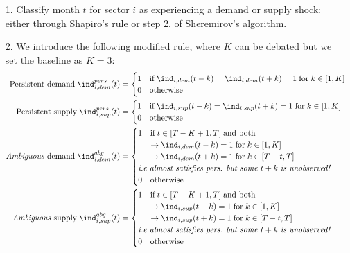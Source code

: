 \begin{itemize}
    \item[1.] Classify month $t$ for sector $i$ as experiencing a demand or supply shock: either through Shapiro's rule or step 2. of Sheremirov's algorithm.
    \item[2.] We introduce the following modified rule, where $K$ can be debated but we set the baseline as $K=3$:
    \begin{align*}
        \textrm{Persistent demand} \; \ind_{i,dem}^{pers}(t) &= \begin{cases} 1 \quad \textrm{if} \; \ind_{i,dem}(t-k)=\ind_{i,dem}(t+k) = 1 \; \textrm{for}\; k \in[1,K] \\ 0 \quad \textrm{otherwise} \end{cases} \\ 
        \textrm{Persistent supply} \; \ind_{i,sup}^{pers}(t) &= \begin{cases} 1 \quad \textrm{if} \; \ind_{i,sup}(t-k)=\ind_{i,sup}(t+k) = 1 \; \textrm{for}\; k \in[1,K] \\ 0 \quad \textrm{otherwise} \end{cases} \\ 
        \textrm{\textit{Ambiguous} demand} \; \ind_{i,dem}^{abg}(t) &= \begin{cases} 1 \quad \textrm{if} \; t\in [T-K+1,T] \; \textrm{and both}\\ \quad \; \; \rightarrow \ind_{i,dem}(t-k)= 1 \; \textrm{for}\; k \in[1,K] \\ \quad \; \; \rightarrow \ind_{i,dem}(t+k)= 1 \; \textrm{for}\; k \in[T-t,T] \\ \textrm{\textit{i.e almost satisfies pers. but some} $t+k$ \textit{is unobserved!}} \\ 0 \quad \textrm{otherwise} \end{cases} \\ 
        \textrm{\textit{Ambiguous} supply} \; \ind_{i,sup}^{abg}(t) &= \begin{cases} 1 \quad \textrm{if} \; t\in [T-K+1,T] \; \textrm{and both}\\ \quad \; \; \rightarrow \ind_{i,sup}(t-k)= 1 \; \textrm{for}\; k \in[1,K] \\ \quad \; \; \rightarrow \ind_{i,sup}(t+k)= 1 \; \textrm{for}\; k \in[T-t,T] \\ \textrm{\textit{i.e almost satisfies pers. but some} $t+k$ \textit{is unobserved!}} \\ 0 \quad \textrm{otherwise} \end{cases} \\ 

\end{align*}
\end{itemize}
